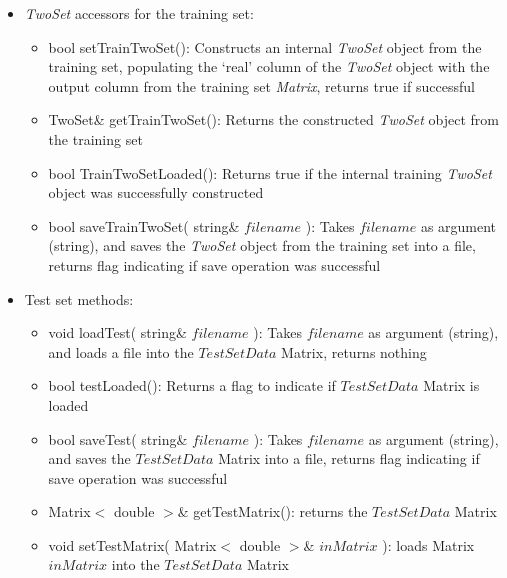 \documentclass{report}
\def\beginred{\color{red}}
\def\endcolor{\color{black}}
\begin{document}
\begin{itemize}
\begin{itemize}
\begin{itemize}
\item \beginred Matrix$<$ double $>$\& getTrainMatrix(): returns the
      $TrainSetData$ Matrix \endcolor
\item void setTrainMatrix( Matrix$<$ double $>$\& $inMatrix$ ): loads
      Matrix $inMatrix$ into the $TrainSetData$ Matrix
\end{itemize}

\item {\em TwoSet} accessors for the training set:
\begin{itemize}
\item \beginred bool setTrainTwoSet(): Constructs an internal {\em
      TwoSet} object from the training set, populating the `real'
      column of the {\em TwoSet} object with the output column from
      the training set {\em Matrix}, returns true if successful
      \endcolor
\item TwoSet\& getTrainTwoSet(): Returns the constructed {\em TwoSet}
      object from the training set
\item bool TrainTwoSetLoaded(): Returns true if the internal training
      {\em TwoSet} object was successfully constructed
\item bool saveTrainTwoSet( string\& $filename$ ): Takes $filename$ as
      argument (string), and saves the {\em TwoSet} object from the
      training set into a file, returns flag indicating if save
      operation was successful
\end{itemize}

\item Test set methods:
\begin{itemize}
\item void loadTest( string\& $filename$ ): Takes $filename$ as
      argument (string), and loads a file into the $TestSetData$
      Matrix, returns nothing
\item \beginred bool testLoaded(): Returns a flag to indicate if
      $TestSetData$ Matrix is loaded \endcolor
\item bool saveTest( string\& $filename$ ): Takes $filename$ as
      argument (string), and saves the $TestSetData$ Matrix into a
      file, returns flag indicating if save operation was successful
\item \beginred Matrix$<$ double $>$\& getTestMatrix(): returns the
      $TestSetData$ Matrix \endcolor
\item void setTestMatrix( Matrix$<$ double $>$\& $inMatrix$ ): loads
      Matrix $inMatrix$ into the $TestSetData$ Matrix
\end{itemize}


\end{itemize}
\end{itemize}
\end{document}
